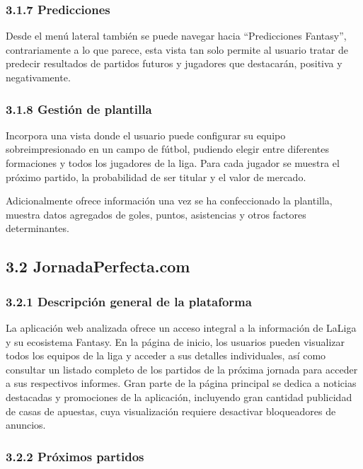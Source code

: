 \subsubsection{3.1.7 Predicciones}

Desde el menú lateral también se puede navegar hacia ``Predicciones Fantasy'', contrariamente a lo 
que parece, esta vista tan solo permite al usuario tratar de predecir resultados de partidos futuros 
y jugadores que destacarán, positiva y negativamente.

\subsubsection{3.1.8 Gestión de plantilla}

Incorpora una vista donde el usuario puede configurar su equipo sobreimpresionado en un campo de 
fútbol, pudiendo elegir entre diferentes formaciones y todos los jugadores de la liga. Para cada 
jugador se muestra el próximo partido, la probabilidad de ser titular y el valor de mercado.

Adicionalmente ofrece información una vez se ha confeccionado la plantilla, muestra datos agregados 
de goles, puntos, asistencias y otros factores determinantes.

\subsection{3.2 JornadaPerfecta.com}

\subsubsection{3.2.1 Descripción general de la plataforma}

La aplicación web analizada ofrece un acceso integral a la información de LaLiga y su ecosistema 
Fantasy. En la página de inicio, los usuarios pueden visualizar todos los equipos de la liga y 
acceder a sus detalles individuales, así como consultar un listado completo de los partidos de la 
próxima jornada para acceder a sus respectivos informes. Gran parte de la página principal se dedica 
a noticias destacadas y promociones de la aplicación, incluyendo gran cantidad publicidad de casas de 
apuestas, cuya visualización requiere desactivar bloqueadores de anuncios.

\subsubsection{3.2.2 Próximos partidos}

